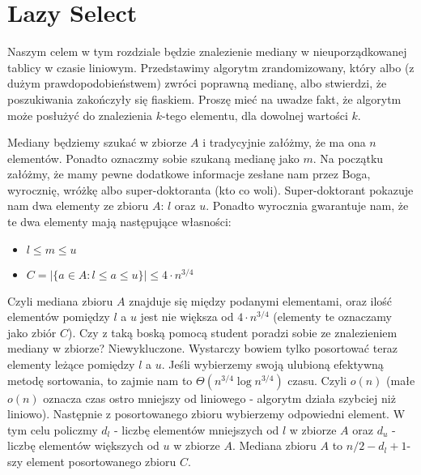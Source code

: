 \section{Lazy Select}
 
Naszym celem w tym rozdziale będzie znalezienie mediany w nieuporządkowanej tablicy w czasie liniowym.
Przedstawimy algorytm zrandomizowany, który albo (z dużym prawdopodobieństwem) zwróci poprawną medianę, albo stwierdzi, że poszukiwania zakończyły się fiaskiem.
Proszę mieć na uwadze fakt, że algorytm może posłużyć do znalezienia $k$-tego elementu, dla dowolnej wartości $k$.

Mediany będziemy szukać w zbiorze $A$ i tradycyjnie załóżmy, że ma ona $n$ elementów.
Ponadto oznaczmy sobie szukaną medianę jako $m$.
Na początku załóżmy, że mamy pewne dodatkowe informacje zesłane nam przez Boga, wyrocznię, wróżkę albo super-doktoranta (kto co woli).
Super-doktorant pokazuje nam dwa elementy ze zbioru $A$: $l$ oraz $u$.
Ponadto wyrocznia gwarantuje nam, że te dwa elementy mają następujące własności:
\begin{itemize}
 \item $l \leq m \leq u$
 \item $C = |\{a \in A: l \leq a \leq u\}| \leq 4 \cdot n^{3/4}$
\end{itemize}
Czyli mediana zbioru $A$ znajduje się między podanymi elementami, oraz ilość elementów pomiędzy $l$ a $u$ jest nie większa od $4 \cdot n^{3/4}$ (elementy te oznaczamy jako zbiór $C$).
Czy z taką boską pomocą student poradzi sobie ze znalezieniem mediany w zbiorze?
Niewykluczone.
Wystarczy bowiem tylko posortować teraz elementy leżące pomiędzy $l$ a $u$.
Jeśli wybierzemy swoją ulubioną efektywną metodę sortowania, to zajmie nam to $\Theta(n^{3/4} \log n^{3/4})$ czasu.
Czyli $o(n)$ (małe $o(n)$ oznacza czas ostro mniejszy od liniowego - algorytm działa szybciej niż liniowo).
Następnie z posortowanego zbioru wybierzemy odpowiedni element.
W tym celu policzmy $d_l$ - liczbę elementów mniejszych od $l$ w zbiorze $A$ oraz $d_u$ - liczbę elementów większych od $u$ w zbiorze $A$.
Mediana zbioru $A$ to $n/2 - d_l + 1$-szy element posortowanego zbioru $C$.

